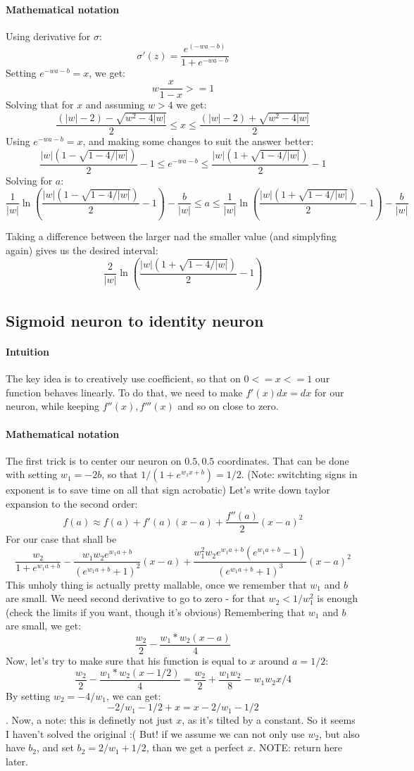 \documentclass{article}
\begin{document}
\paragraph{Mathematical notation}
Using derivative for $\sigma$:
$$\sigma'(z) = \frac{e^(-wa-b)}{1 + e^{-wa-b}}$$
Setting $e^{-wa-b} = x$, we get:
$$w \frac{x}{1-x} >= 1$$
Solving that for $x$ and assuming $w > 4$ we get:
$$\frac{(|w|-2)-\sqrt{w^2-4|w|}}{2} \leq x \leq \frac{(|w|-2)+\sqrt{w^2-4|w|}}{2}$$
Using $e^{-wa-b} = x$, and making some changes to suit the answer better:
$$\frac{|w|\left(1-\sqrt{1-4/|w|}\right)}{2}-1 \leq e^{-wa-b} \leq \frac{|w|\left(1+\sqrt{1-4/|w|}\right)}{2}-1$$
Solving for $a$:
$$\frac{1}{|w|}\ln\left(\frac{|w|\left(1-\sqrt{1-4/|w|}\right)}{2}-1\right) - \frac{b}{|w|}\leq a \leq \frac{1}{|w|}\ln\left(\frac{|w|\left(1+\sqrt{1-4/|w|}\right)}{2}-1\right)-\frac{b}{|w|}$$

Taking a difference between the larger nad the smaller value (and simplyfing again) gives us the desired interval:
$$\frac{2}{|w|} \ln{\left(\frac{|w|(1+\sqrt{1-4/|w|})}{2}-1\right)}$$

\subsection{Sigmoid neuron to identity neuron}
\paragraph{Intuition}
The key idea is to creatively use coefficient, so that on $0 <= x <= 1$ our function behaves linearly.
To do that, we need to make $f'(x)dx = dx$ for our neuron, while keeping $f''(x), f'''(x)$ and so on close to zero.
\paragraph{Mathematical notation}
The first trick is to center our neuron on ${0.5, 0.5}$ coordinates.
That can be done with setting $w_1 = -2b$, so that $1/(1+e^{w_1x + b}) = 1/2$.
(Note: switchting signs in exponent is to save time on all that sign acrobatic)
Let's write down taylor expansion to the second order:
$$f(a) \approx f(a) + f'(a)(x-a) + \frac{f''(a)}{2} (x-a)^2$$
For our case that shall be
$$\frac{w_2}{1 + e^{w_1a+b}} - \frac{w_1w_2 e^{w_1a+b}}{(e^{w_1a+b} + 1)^2} (x-a) + \frac{w_{1}^{2} w_2 e^{w_1a+b} (e^{w_1a+b} - 1) }{(e^{w_1a+b} + 1)^3} (x-a)^2$$
This unholy thing is actually pretty mallable, once we remember that $w_1$ and $b$ are small.
We need second derivative to go to zero - for that $w_2 < 1/w_{1}^2$ is enough (check the limits if you want, though it's obvious)
Remembering that $w_1$ and $b$ are small, we get:
$$\frac{w_2}{2} - \frac{w_1 * w_2 (x - a)}{4}$$
Now, let's try to make sure that his function is equal to $x$ around $a = 1/2$:
$$\frac{w_2}{2} - \frac{w_1*w_2 (x - 1/2)}{4} = \frac{w_2}{2} + \frac{w_1 w_2}{8} - w_1w_2x/4$$
By setting $w_2 = -4/w_1$, we can get:
$$-2/w_1 -1/2 + x = x - 2/w_1 - 1/2$$.
Now, a note: this is definetly not just $x$, as it's tilted by a constant. So it seems I haven't solved the original :(
But! if we assume we can not only use $w_2$, but also have $b_2$, and set $b_2 = 2/w_1 + 1/2$,
than we get a perfect $x$.
NOTE: return here later.
\end{document}
